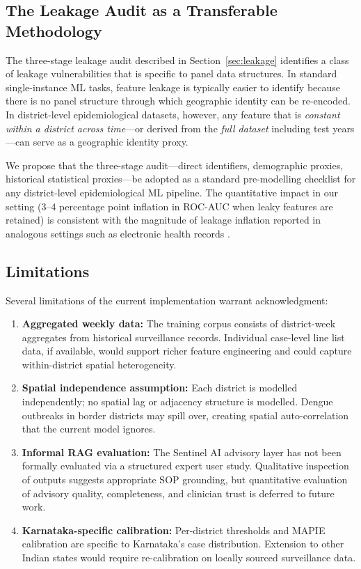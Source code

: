 \documentclass[conference]{IEEEtran}
\begin{document}
\subsection{The Leakage Audit as a Transferable Methodology}

The three-stage leakage audit described in Section~\ref{sec:leakage}
identifies a class of leakage vulnerabilities that is specific to
panel data structures. In standard single-instance ML tasks,
feature leakage is typically easier to identify because there is no
panel structure through which geographic identity can be re-encoded.
In district-level epidemiological datasets, however, any feature
that is \emph{constant within a district across time}---or derived
from the \emph{full dataset} including test years---can serve as a
geographic identity proxy.

We propose that the three-stage audit---direct identifiers,
demographic proxies, historical statistical proxies---be adopted as
a standard pre-modelling checklist for any district-level
epidemiological ML pipeline. The quantitative impact in our setting
(3--4 percentage point inflation in ROC-AUC when leaky features are
retained) is consistent with the magnitude of leakage inflation
reported in analogous settings such as electronic health records
\cite{lundberg2020}.

\subsection{Limitations}

Several limitations of the current implementation warrant
acknowledgment:

\begin{enumerate}
  \item \textbf{Aggregated weekly data:} The training corpus
    consists of district-week aggregates from historical surveillance
    records. Individual case-level line list data, if available,
    would support richer feature engineering and could capture
    within-district spatial heterogeneity.

  \item \textbf{Spatial independence assumption:} Each district is
    modelled independently; no spatial lag or adjacency structure
    is modelled. Dengue outbreaks in border districts may spill
    over, creating spatial auto-correlation that the current model
    ignores.

  \item \textbf{Informal RAG evaluation:} The Sentinel AI advisory
    layer has not been formally evaluated via a structured expert
    user study. Qualitative inspection of outputs suggests
    appropriate SOP grounding, but quantitative evaluation of
    advisory quality, completeness, and clinician trust is
    deferred to future work.

  \item \textbf{Karnataka-specific calibration:} Per-district
    thresholds and MAPIE calibration are specific to Karnataka's
    case distribution. Extension to other Indian states would
    require re-calibration on locally sourced surveillance data.
\end{enumerate}
\end{document}
